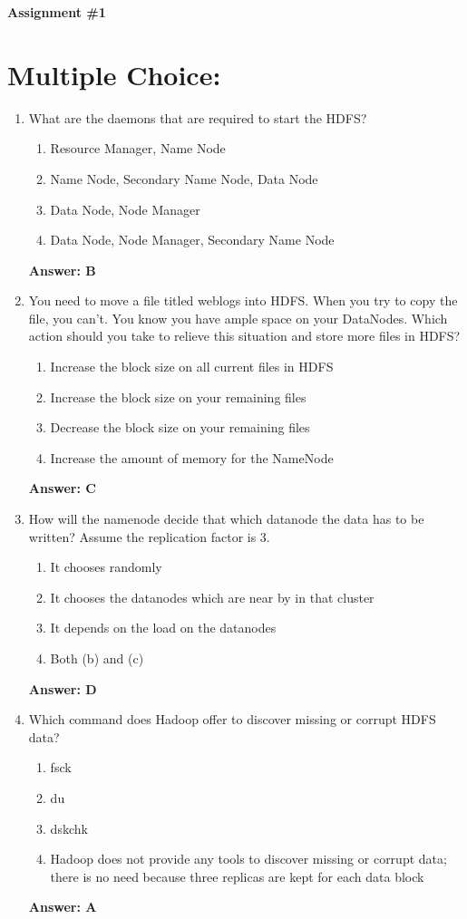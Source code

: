 \documentclass[12pt]{article}
\begin{document}
\begin{center} \textbf{Assignment \#1} \end{center}

\section{Multiple Choice: }
\begin{enumerate} 

\item What are the daemons that are required to start the HDFS? 
\begin{enumerate} 
\item Resource Manager, Name Node
\item Name Node, Secondary Name Node, Data Node
\item Data Node, Node Manager
\item Data Node, Node Manager, Secondary Name Node
\end{enumerate} \textbf{Answer: B}

\item You need to move a file titled weblogs into HDFS. When you try to copy the file, you can't. You know you have ample space on your DataNodes. Which action should you take to relieve this situation and store more files in HDFS? 
\begin{enumerate} 
\item Increase the block size on all current files in HDFS
\item Increase the block size on your remaining files
\item Decrease the block size on your remaining files
\item Increase the amount of memory for the NameNode
\end{enumerate} \textbf{Answer: C}

\item How will the namenode decide that which datanode the data has to be written? Assume the replication factor is 3. 
\begin{enumerate} 
\item It chooses randomly
\item It chooses the datanodes which are near by in that cluster
\item It depends on the load on the datanodes
\item Both (b) and (c)
\end{enumerate} \textbf{Answer: D}

\item Which command does Hadoop offer to discover missing or corrupt HDFS data?
\begin{enumerate} 
\item fsck
\item du
\item dskchk
\item Hadoop does not provide any tools to discover missing or corrupt data; there is no need because three replicas are kept for each data block
\end{enumerate} \textbf{Answer: A}
 

\end{enumerate}
\end{document}
